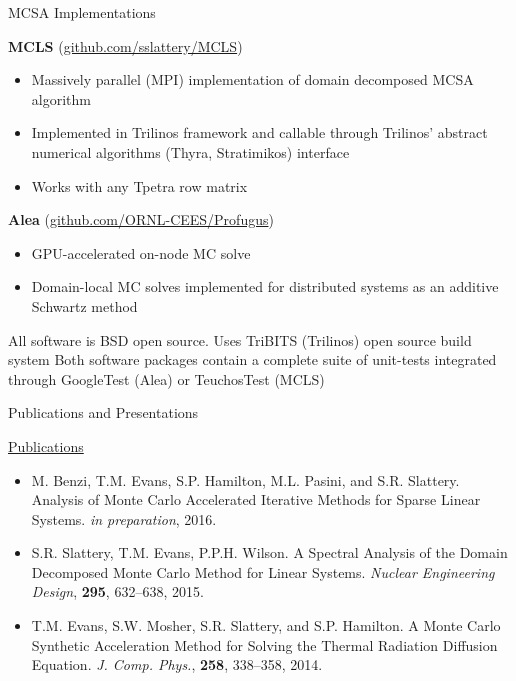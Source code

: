 \documentclass{beamer}
\begin{document}
\begin{frame}{MCSA Implementations}


  {\bf MCLS} (\underline{github.com/sslattery/MCLS})
  \begin{itemize}
  \item Massively parallel (MPI) implementation of domain decomposed MCSA
    algorithm
  \item Implemented in Trilinos framework and callable through Trilinos'
    abstract numerical algorithms (Thyra, Stratimikos) interface
  \item Works with any Tpetra row matrix
  \end{itemize}
  \vfill
  {\bf Alea} (\underline{github.com/ORNL-CEES/Profugus})
  \begin{itemize}
  \item GPU-accelerated on-node MC solve
  \item Domain-local MC solves implemented for distributed systems as an
    additive Schwartz method
  \end{itemize}
  \vfill
  All software is BSD open source.
  \vfill
  Uses TriBITS (Trilinos) open source build system
  \vfill
  Both software packages contain a complete suite of unit-tests integrated
  through GoogleTest (Alea) or TeuchosTest (MCLS)
\end{frame}


\begin{frame}{Publications and Presentations}

  \underline{Publications}
  \begin{itemize}
  \item M. Benzi, T.M. Evans, S.P. Hamilton, M.L. Pasini, and
    S.R. Slattery. Analysis of Monte Carlo Accelerated Iterative Methods for
    Sparse Linear Systems. \textit{in preparation}, 2016.
  \item S.R. Slattery, T.M. Evans, P.P.H. Wilson. A Spectral Analysis of the
    Domain Decomposed Monte Carlo Method for Linear Systems. \textit{Nuclear
      Engineering Design},  {\bf 295}, 632--638, 2015.
  \item T.M. Evans, S.W. Mosher, S.R. Slattery, and S.P. Hamilton. A Monte Carlo
    Synthetic Acceleration Method for Solving the Thermal Radiation Diffusion
    Equation. \textit{J. Comp. Phys.}, {\bf 258}, 338--358, 2014.
  \end{itemize}

\end{frame}
\end{document}
